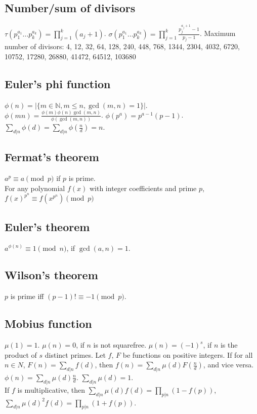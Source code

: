 \documentclass[12pt]{extarticle}
\begin{document}
\begin{multicols*}{2}
\subsection{Number/sum of divisors}
$\tau(p_1^{a_1} \dots p_k^{a_k}) = \prod_{j=1}^k (a_j+1)$. \quad
$\sigma(p_1^{a_1} \dots p_k^{a_k}) = \prod_{j=1}^k \frac{p_j^{a_j+1}-1}{p_j-1}$.
Maximum number of divisors: 4, 12, 32, 64, 128, 240, 448, 768, 1344, 2304, 4032, 6720, 10752, 17280, 26880, 41472, 64512, 103680

\subsection{Euler's phi function}
$\phi(n)=|\{m \in {\mathbb N}, m \le n, \gcd(m, n) = 1 \}|$. \\

$\phi(mn) = \frac{\phi(m) \phi(n) \gcd(m,n)}{\phi(\gcd(m,n))}$. \quad
$\phi(p^a) = p^{a-1} (p-1)$. \quad \\

$\sum_{d|n} \phi(d) = \sum_{d|n} \phi(\frac{n}{d}) = n$.

\subsection{Fermat's theorem}  $a^p \equiv a \pmod{p}$ if $p$ is prime. \\
For any polynomial $f(x)$ with integer coefficients and prime $p$,
$f(x)^{p^n} \equiv f(x^{p^n}) \pmod{p}$
\subsection{Euler's theorem} $a^{\phi(n)} \equiv 1\pmod{n}$, if $\gcd(a,n)=1$. \\
\subsection{Wilson's theorem} $p$ is prime iff $(p - 1)! \equiv -1 \pmod p$.

\subsection{Mobius function}
$\mu(1) = 1$. $\mu(n) = 0$, if $n$ is not squarefree.
$\mu(n) = (-1)^s$, if $n$ is the product of $s$ distinct primes.
Let $f$, $F$ be functions on positive integers.
If for all $n \in N$, $F(n)=\sum_{d|n} f(d)$, then $f(n) = \sum_{d|n} \mu(d) F(\frac{n}{d})$,
and vice versa. \quad
$\phi(n) = \sum_{d|n} \mu(d) \frac{n}{d}$.
\quad $\sum_{d|n} \mu(d) = 1$. \\
If $f$ is multiplicative, then $\sum_{d|n} \mu(d) f(d) = \prod_{p|n}(1-f(p))$,
$\sum_{d|n} \mu(d)^2 f(d) = \prod_{p|n} (1+f(p))$.


\end{multicols*}
\end{document}

